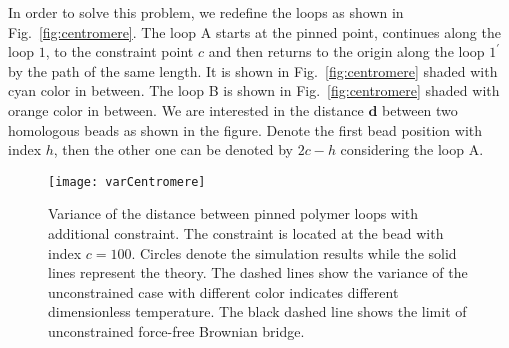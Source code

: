 In order to solve this problem, we redefine the loops as shown in Fig.~\ref{fig:centromere}. The loop A starts at the pinned point, continues along the loop $1$, to the constraint point $c$ and then returns to the origin along the loop $1^\prime$ by the path of the same length. It is shown in Fig.~\ref{fig:centromere} shaded with cyan color in between. The loop B is shown in Fig.~\ref{fig:centromere} shaded with orange color in between. We are interested in the distance $\mathbf{d}$ between two homologous beads as shown in the figure. Denote the first bead position with index $h$, then the other one can be denoted by $2c-h$ considering the loop A. 
\begin{figure}[htpb]
    \centering
    \texttt{[image: varCentromere]}
    \caption{Variance of the distance between pinned polymer loops with additional constraint. The constraint is located at the bead with index $c=100$. Circles denote the simulation results while the solid lines represent the theory. The dashed lines show the variance of the unconstrained case with different color indicates different dimensionless temperature. The black dashed line shows the limit of unconstrained force-free Brownian bridge.}
    \label{fig:varCentromere}
\end{figure}

